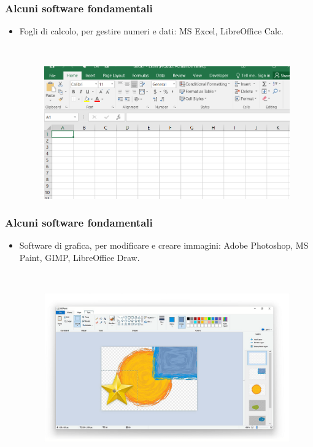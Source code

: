 \documentclass[handout]{beamer}
\begin{document}
\begin{frame}
\frametitle{Alcuni software fondamentali}
\begin{itemize}
  \item Fogli di calcolo, per gestire numeri e dati: MS Excel, LibreOffice Calc.
  
  ~

  \begin{figure}
    \includegraphics[width=.9\columnwidth]{img/excel.png}
  \end{figure}
\end{itemize}
\end{frame}





\begin{frame}
\frametitle{Alcuni software fondamentali}
\begin{itemize}
  \item Software di grafica, per modificare e creare immagini: Adobe Photoshop, MS Paint, GIMP, LibreOffice Draw.
  
  ~

  \begin{figure}
    \includegraphics[width=.9\columnwidth]{img/paint.png}
  \end{figure}
\end{itemize}
\end{frame}
\end{document}
